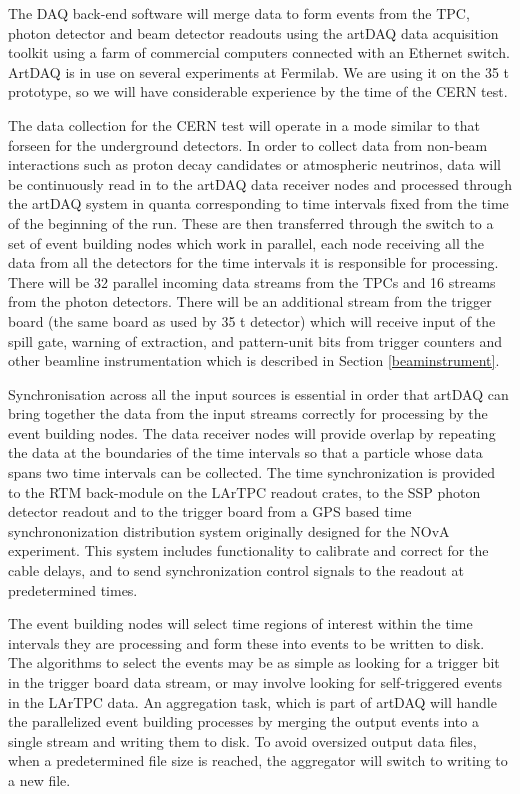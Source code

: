 The DAQ back-end software will merge data to form events from the TPC, 
photon detector and beam detector readouts using the 
artDAQ data acquisition toolkit using a farm of commercial 
computers connected with an Ethernet switch.  ArtDAQ is 
in use on several experiments at Fermilab.  We are using it
on the 35 t prototype, so we will have considerable 
experience by the time of the CERN test.  

The data collection for the CERN test will operate in a mode 
similar to that forseen for the underground detectors. In order 
to collect data from non-beam interactions such as proton decay 
candidates or atmospheric neutrinos, data will be continuously
read in to the artDAQ data receiver nodes and processed through
the artDAQ system in quanta corresponding to time intervals fixed
from the time of the beginning of the run.  These are then 
transferred through the switch to a set of event building nodes 
which work in parallel, each node receiving all the data from all 
the detectors for the time intervals it is responsible for processing.
There will be 32 parallel incoming data streams from the TPCs
and 16 streams from the photon detectors.  There will be an additional
stream from the trigger board (the same board as used by 35 t detector) 
which will receive input of the spill 
gate, warning of extraction, and pattern-unit bits from trigger counters
and other beamline instrumentation which is described in Section \ref{beaminstrument}.

Synchronisation across all the input sources is essential in order 
that artDAQ can bring together the data from the input streams correctly for
processing by the event building nodes.  The data receiver nodes will provide
overlap by repeating the data at the boundaries of the time intervals so 
that a particle whose data spans two time intervals can be collected.  
The time synchronization is provided to the RTM back-module on the LArTPC 
readout crates, to the SSP photon detector readout and to the trigger board from
a GPS based time synchrononization distribution system originally designed 
for the NOvA experiment.  This system includes functionality to calibrate and 
correct for the cable delays, and to send synchronization control signals to
the readout at predetermined times.

The event building nodes will select time regions of interest within the time 
intervals they are processing and form these into events to be written to 
disk. The algorithms to select the events may be as simple as looking for 
a trigger bit in the trigger board data stream, or may involve looking 
for self-triggered events in the LArTPC data.  An aggregation task, which 
is part of artDAQ will handle the parallelized event building processes by 
merging the output events into a single stream and writing them to disk.
To avoid oversized output data files, when a predetermined file size is reached, 
the aggregator will switch to writing to a new file.  

